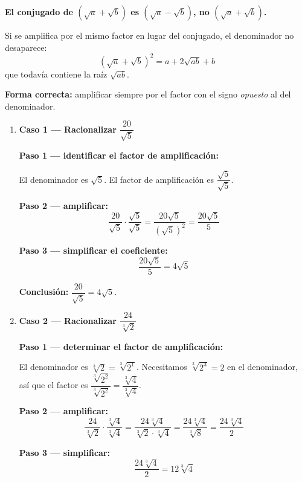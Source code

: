\documentclass[11pt, letterpaper]{article}
\begin{document}
\begin{tcolorbox}[warningbox, title={Error frecuente — elegir el factor incorrecto en el Caso 3}]
\textbf{El conjugado de $(\sqrt{a}+\sqrt{b})$ es $(\sqrt{a}-\sqrt{b})$, no $(\sqrt{a}+\sqrt{b})$.}

Si se amplifica por el mismo factor en lugar del conjugado, el denominador no desaparece:
$$(\sqrt{a}+\sqrt{b})^2 = a + 2\sqrt{ab} + b$$
que todavía contiene la raíz $\sqrt{ab}$.

\medskip
\textbf{Forma correcta:} amplificar siempre por el factor con el signo \emph{opuesto} al del denominador.
\end{tcolorbox}

\begin{tcolorbox}[examplebox, title={Ejemplos}]
\begin{enumerate}[label=\textbf{Ej. \arabic*.}, leftmargin=*, itemsep=18pt]

\item \textbf{Caso 1 — Racionalizar $\dfrac{20}{\sqrt{5}}$}

\textbf{Paso 1 — identificar el factor de amplificación:}

El denominador es $\sqrt{5}$. El factor de amplificación es $\dfrac{\sqrt{5}}{\sqrt{5}}$.

\textbf{Paso 2 — amplificar:}
$$\frac{20}{\sqrt{5}} \cdot \frac{\sqrt{5}}{\sqrt{5}} = \frac{20\sqrt{5}}{(\sqrt{5})^2} = \frac{20\sqrt{5}}{5}$$

\textbf{Paso 3 — simplificar el coeficiente:}
$$\frac{20\sqrt{5}}{5} = 4\sqrt{5}$$

\textbf{Conclusión:} $\dfrac{20}{\sqrt{5}} = 4\sqrt{5}$.

\item \textbf{Caso 2 — Racionalizar $\dfrac{24}{\sqrt[3]{2}}$}

\textbf{Paso 1 — determinar el factor de amplificación:}

El denominador es $\sqrt[3]{2} = \sqrt[3]{2^1}$. Necesitamos $\sqrt[3]{2^3} = 2$ en el denominador, así que el factor es $\dfrac{\sqrt[3]{2^2}}{\sqrt[3]{2^2}} = \dfrac{\sqrt[3]{4}}{\sqrt[3]{4}}$.

\textbf{Paso 2 — amplificar:}
$$\frac{24}{\sqrt[3]{2}} \cdot \frac{\sqrt[3]{4}}{\sqrt[3]{4}} = \frac{24\sqrt[3]{4}}{\sqrt[3]{2} \cdot \sqrt[3]{4}} = \frac{24\sqrt[3]{4}}{\sqrt[3]{8}} = \frac{24\sqrt[3]{4}}{2}$$

\textbf{Paso 3 — simplificar:}
$$\frac{24\sqrt[3]{4}}{2} = 12\sqrt[3]{4}$$


\end{enumerate}
\end{tcolorbox}
\end{document}
